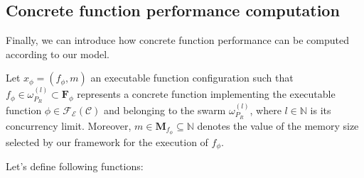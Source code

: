 \documentclass[12pt,a4paper]{report}
\newcommand{\N}{\mathbb{N}}
\begin{document}
\subsection{Concrete function performance computation}

Finally, we can introduce how concrete function performance can be computed according to our model.

Let $x_{\phi} = (f_{\phi},m)$ an executable function configuration such that $f_{\phi} \in \omega_{P_R}^{(l)} \subset \textbf{F}_{\phi}$ represents a concrete function implementing the executable function $\phi \in \mathscr{F_E}(\mathcal{C})$ and belonging to the swarm $\omega_{P_R}^{(l)}$, where $l \in \N$ is its concurrency limit. Moreover, $m \in \textbf{M}_{f_{\phi}} \subseteq \N$ denotes the value of the memory size selected by our framework for the execution of $f_{\phi}$.

Let's define following functions:
\end{document}
